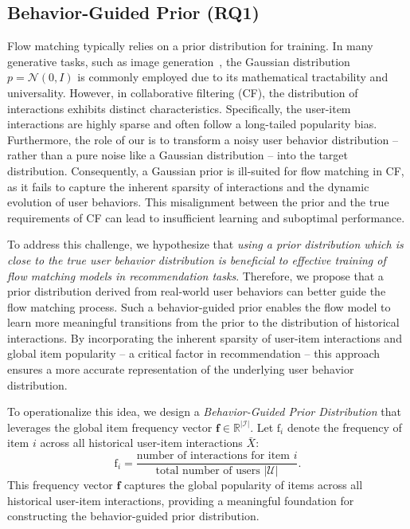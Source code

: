 \documentclass[sigconf]{acmart}
\begin{document}
\subsection{Behavior-Guided Prior (RQ1)}
Flow matching typically relies on a prior distribution for training. In many generative tasks, such as image generation~\cite{lipman2022flow, liu2022flow}, the Gaussian distribution $p = \mathcal{N} (0, I )$ is commonly employed due to its mathematical tractability and universality. However, in collaborative filtering (CF), the distribution of interactions exhibits distinct characteristics. Specifically, the user-item interactions are highly sparse and often follow a long-tailed popularity bias. Furthermore, the role of our \ours is to transform a noisy user behavior distribution -- rather than a pure noise like a Gaussian distribution -- into the target distribution. Consequently, a Gaussian prior is ill-suited for flow matching in CF, as it fails to capture the inherent sparsity of interactions and the dynamic evolution of user behaviors. This misalignment between the prior and the true requirements of CF can lead to insufficient learning and suboptimal performance.

To address this challenge, we hypothesize that \textit{using a prior distribution which is close to the true user behavior distribution is beneficial to effective training of flow matching models in recommendation tasks}. Therefore, we propose that a prior distribution derived from real-world user behaviors can better guide the flow matching process. Such a behavior-guided prior enables the flow model to learn more meaningful transitions from the prior to the distribution of historical interactions. By incorporating the inherent sparsity of user-item interactions and global item popularity -- a critical factor in recommendation -- this approach ensures a more accurate representation of the underlying user behavior distribution.

To operationalize this idea, we design a \textit{Behavior-Guided Prior Distribution} that leverages the global item frequency vector $\mathbf f \in \mathbb R^{|\mathcal I|}$. Let $\mathrm f_i$ denote the frequency of item $i$ across all historical user-item interactions $\bar X$:
\begin{equation}
\mathrm f_i=\frac{\text{number of interactions for item } i}{\text{total number of users } |\mathcal U|}.
\end{equation}
This frequency vector $\mathbf f$ captures the global popularity of items across all historical user-item interactions, providing a meaningful foundation for constructing the behavior-guided prior distribution.
\end{document}
